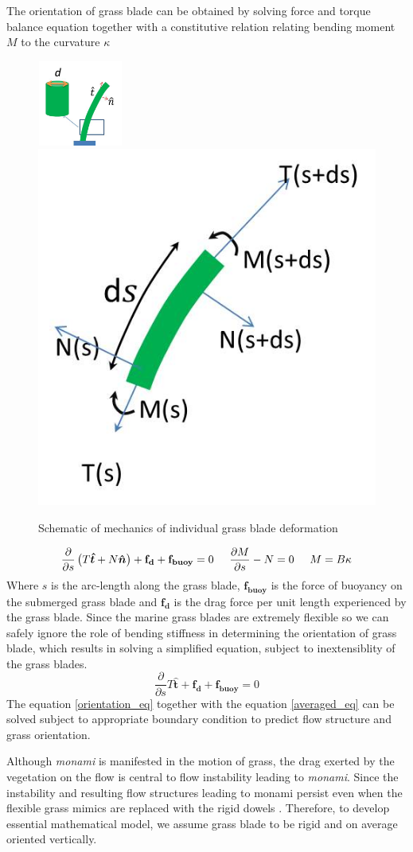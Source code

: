 \documentclass[12pt]{report}   %
\newcommand{\bn}{{\boldsymbol{\hat{n}}}}
\newcommand{\bt}{{\boldsymbol{\hat{t}}}}
\newcommand{\monami}{\textit{monami}}
\begin{document}
The orientation of grass blade can be obtained by solving force and torque balance equation together with a constitutive relation relating bending moment $M$ to the curvature $\kappa$
\begin{figure}
 \centerline{\includegraphics[width=2.8cm, height = 2.8cm]{Grass_mod1}\hspace{2.5cm} \includegraphics[width=3.cm,height=3.cm]{Grass_mod2}}
 \caption{Schematic of mechanics of individual grass blade deformation}
 \label{grass_blade_deformation}
\end{figure}
\begin{equation}
 \frac{\partial}{\partial s}\left( T\bt + N\bn \right)+\mathbf{f_d}+\mathbf{f_{buoy}} =0 \hspace{.5cm} \frac{\partial M}{\partial s} -N =0 \hspace{.5cm}  M = B\kappa
\end{equation}
Where $s$ is the arc-length along the grass blade, $\mathbf{f_{buoy}}$ is the force of buoyancy on the submerged grass blade and $\mathbf{f_{d}}$ is the drag force per unit length experienced by the grass blade. Since the marine grass blades are extremely flexible so we can safely ignore the role of bending stiffness in determining the orientation of grass blade,  which results in solving a simplified equation, subject to inextensiblity of the grass blades. 
\begin{equation}
  \frac{\partial}{\partial s} T\bt +\mathbf{f_d}+\mathbf{f_{buoy}} =0
  \label{orientation_eq}
\end{equation}
The equation \eqref{orientation_eq} together with the equation \eqref{averaged_eq} can be solved subject to appropriate boundary condition to predict flow structure and grass orientation.

Although {\monami} is manifested in the motion of grass, the drag exerted by the vegetation on the flow is central to flow instability leading to {\monami}. Since the instability and resulting flow structures leading to monami persist even when the flexible grass mimics are replaced with the rigid dowels \cite{Ghisal02,Nepf06}. Therefore, to develop essential mathematical model, we assume grass blade to be rigid and on average oriented vertically.
\end{document}
